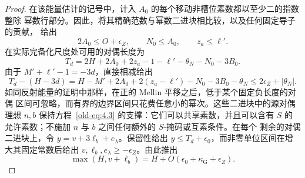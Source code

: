 \documentclass[11pt,a4paper]{article}
\numberwithin{equation}{section}
\numberwithin{figure}{section}
\theoremstyle{definition}
\theoremstyle{remark}
\begin{document}
\begin{proof}
在该能量估计的记号中，计入 $A_0$ 的每个移动非槽位素数都以至少二的指数整除
幂数行部分。因此，将其精确范数与幂数二进块相比较，以及任何固定导子的贡献，
给出
\[
 2A_0\le O+\epsilon_Z,\qquad N_0\le A_0,\qquad z_a\le\ell'.
\]
在实际完备化尺度处可用的对偶长度为
\[
 T_d=2H+2A_0+2z_a-1-\ell'-\theta_N-N_0-3B_0.
\]
由于 $M'+\ell'-1=-3d$，直接相减给出
\[
 T_d-(H-3d)
 =H-M'+2A_0+2(z_a-\ell')-N_0-3B_0-\theta_N
 \le 2\epsilon_Z+|\theta_N|.
\]
如同反射能量的证明中那样，在正的 Mellin 平移之后，低于某个固定负长度的对偶
区间可忽略，而有界的边界区间只花费任意小的幂次。这些二进块中的源对偶理想
$n,b$ 保持方程~\eqref{old-eq:4.3} 的支撑：它们可以共享素数，并且可以含有
$S$ 的允许素数；不施加 $n$ 与 $b$ 之间任何额外的 $S$-掩码或互素条件。在每个
剩余的对偶二进块上，令 $y=v+3\ell_b+e_\lambda$。保留性给出
$y\le T_d+\epsilon_0$，而非零单位区间在增大其固定常数后给出
$v,\ell_b,e_\lambda\ge-\epsilon_Z$。由此推出
\[
 \max(H,v+\ell_b)=H+O(\epsilon_0+\kappa_{\mathrm G}+\epsilon_Z).
\]


\end{proof}
\end{document}
